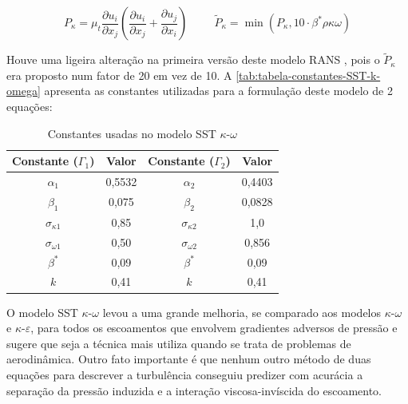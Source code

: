 \begin{equation}
	\label{eq:producao-tilde-k-modelo-sst-k-omega}
	P_{\kappa} = \mu_{t}\frac{\partial u_i}{\partial x_j}\left(\frac{\partial u_i}{\partial x_j} + \frac{\partial u_j}{\partial x_i}\right)
	\hspace{1cm}
	\tilde{P}_{\kappa} = \min(P_\kappa, 10\cdot\beta^{*}\rho\kappa\omega)
\end{equation}

Houve uma ligeira alteração na primeira versão deste modelo RANS \cite{Menter1994TwoequationET}, pois o $\tilde{P}_{\kappa}$ era proposto num fator de 20 em vez de 10. A \autoref{tab:tabela-constantes-SST-k-omega} apresenta as constantes utilizadas para a formulação deste modelo de 2 equações:

\begin{table}[ht]
\centering
\caption[Constantes usadas no modelo SST $\kappa$-$\omega$ \cite{Menter1994TwoequationET,Menter2003,Menter2009}]{Constantes usadas no modelo SST $\kappa$-$\omega$ \cite{Menter1994TwoequationET,Menter2003,Menter2009}}
\vspace{0.5cm}
\begin{tabular}{c|c|c|c}
 
Constante ($\Gamma_1$) & Valor & Constante ($\Gamma_2$) & Valor \\
\hline
$\alpha_1$ & 0,5532 & $\alpha_2$ & 0,4403 \\
$\beta_1$ & 0,075 & $\beta_2$ & 0,0828 \\
$\sigma_{\kappa 1}$ & 0,85 & $\sigma_{\kappa 2}$ & 1,0 \\
$\sigma_{\omega 1}$ & 0,50 & $\sigma_{\omega 2}$ & 0,856 \\
$\beta^{*}$ & 0,09 & $\beta^{*}$ & 0,09 \\
$k$ & 0,41 & $k$ & 0,41

\end{tabular}
\label{tab:tabela-constantes-SST-k-omega}
\end{table}

O modelo SST $\kappa$-$\omega$ levou a uma grande melhoria, se comparado aos modelos $\kappa$-$\omega$ e $\kappa$-$\varepsilon$, para todos os escoamentos que envolvem gradientes adversos de pressão e \citeauthor{Menter1994TwoequationET} sugere que seja a técnica mais utiliza quando se trata de problemas de aerodinâmica. Outro fato importante é que nenhum outro método de duas equações para descrever a turbulência conseguiu predizer com acurácia a separação da pressão induzida e a interação viscosa-invíscida do escoamento.